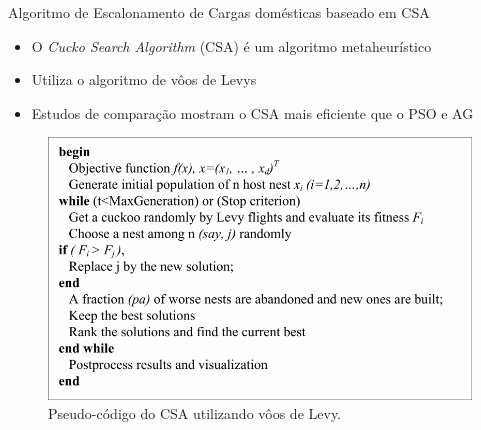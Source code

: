 \begin{frame}
  \begin{block}{\small Algoritmo de Escalonamento de Cargas domésticas baseado em CSA}
    \begin{itemize}
      \item \small O \textit{Cucko Search Algorithm} (CSA) é um algoritmo
      metaheurístico
      \item \small Utiliza o algoritmo de vôos de Levys
      \item \small Estudos de comparação mostram o CSA mais eficiente que o PSO e AG
    \end{itemize}
  \end{block}
  \begin{figure}[h]
  	\begin{center}
      \includegraphics [scale=0.28]{./Figures/csa}
      \caption {Pseudo-código do CSA utilizando vôos de Levy.}
  	\end{center}
  \end{figure}
\end{frame}

